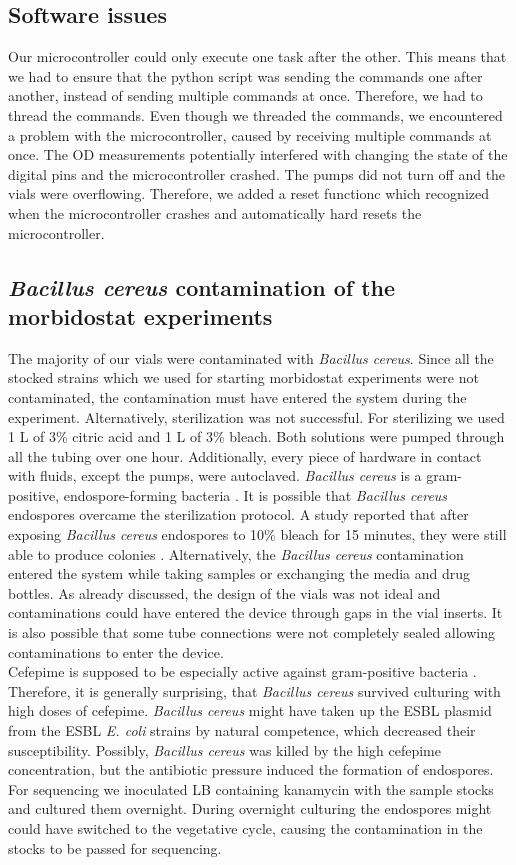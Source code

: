 \subsection{Software issues}
Our microcontroller could only execute one task after the other. This means that we had to ensure that the python script was sending the commands one after another, instead of sending multiple commands at once. Therefore, we had to thread the commands.  Even though we threaded the commands, we encountered a problem with the microcontroller, caused by receiving multiple commands at once. The OD measurements potentially interfered with changing the state of the digital pins and the microcontroller crashed. The pumps did not turn off and the vials were overflowing. Therefore, we added a reset functionc which recognized when the microcontroller crashes and automatically hard resets the microcontroller.   

\subsection{\textit{Bacillus cereus} contamination of the morbidostat experiments}
The majority of our vials were contaminated with \textit{Bacillus cereus}. Since all the stocked strains which we used for starting morbidostat experiments were not contaminated, the contamination must have entered the system during the experiment. Alternatively, sterilization was not successful. For sterilizing we used 1 L of 3\% citric acid and 1 L of 3\% bleach. Both solutions were pumped through all the tubing over one hour. Additionally, every piece of hardware in contact with fluids, except the pumps, were autoclaved. \textit{Bacillus cereus} is a gram-positive, endospore-forming bacteria \cite{bintsis_foodborne_2017}. It is possible that \textit{Bacillus cereus} endospores overcame the sterilization protocol. A study reported that after exposing \textit{Bacillus cereus} endospores to 10\% bleach for 15 minutes, they were still able to produce colonies \cite{robertson_effect_2018}. Alternatively, the \textit{Bacillus cereus} contamination entered the system while taking samples or exchanging the media and drug bottles. As already discussed, the design of the vials was not ideal and contaminations could have entered the device through gaps in the vial inserts. It is also possible that some tube connections were not completely sealed allowing contaminations to enter the device.  \\
Cefepime is supposed to be especially active against gram-positive bacteria \cite{sykes_chapter_2014}. Therefore, it is generally surprising, that \textit{Bacillus cereus} survived culturing with high doses of cefepime. \textit{Bacillus cereus} might have taken up the ESBL plasmid from the ESBL \textit{E. coli} strains by natural competence, which decreased their susceptibility. Possibly, \textit{Bacillus cereus} was killed by the high cefepime concentration, but the antibiotic pressure induced the formation of endospores. For sequencing we inoculated LB containing kanamycin with the sample stocks and cultured them overnight. During overnight culturing the endospores might could have switched to the vegetative cycle, causing the contamination in the stocks to be passed for sequencing.

